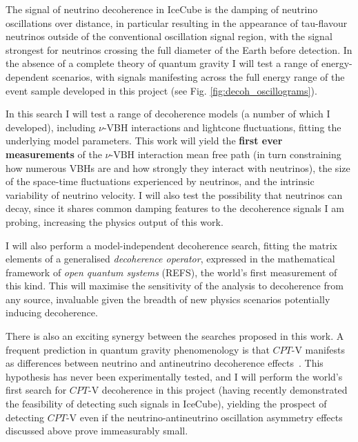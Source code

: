 \documentclass[a4paper,11pt]{article}
\begin{document}
The signal of neutrino decoherence in IceCube is the damping of neutrino oscillations over distance, in particular resulting in the appearance of tau-flavour neutrinos outside of the conventional oscillation signal region, with the signal strongest for neutrinos crossing the full diameter of the Earth before detection. In the absence of a complete theory of quantum gravity I will test a range of energy-dependent scenarios, with signals manifesting across the full energy range of the event sample developed in this project (see Fig. \ref{fig:decoh_oscillograms}).

In this search I will test a range of decoherence models (a number of which I developed), including $\nu$-VBH interactions and lightcone fluctuations, fitting the underlying model parameters. This work will yield the \textbf{first ever measurements} of the $\nu$-VBH interaction mean free path (in turn constraining how numerous VBHs are and how strongly they interact with neutrinos), the size of the space-time fluctuations experienced by neutrinos, and the intrinsic variability of neutrino velocity. I will also test the possibility that neutrinos can decay, since it shares common damping features to the decoherence signals I am probing, increasing the physics output of this work.

I will also perform a model-independent decoherence search, fitting the matrix elements of a generalised \textit{decoherence operator}, expressed in the mathematical framework of \textit{open quantum systems} (REFS), the world's first measurement of this kind. This will maximise the sensitivity of the analysis to decoherence from any source, invaluable given the breadth of new physics scenarios potentially inducing decoherence. 



There is also an exciting synergy between the searches proposed in this work. A frequent prediction in quantum gravity phenomenology is that $CPT$-V manifests as differences between neutrino and antineutrino decoherence effects~\cite{Mavromatos_2009, Barenboim:2004wu, Carrasco:2018sca, Buoninfante:2020iyr, Capolupo:2020myw}. This hypothesis has never been experimentally tested, and I will perform the world's first search for $CPT$-V decoherence in this project (having recently demonstrated the feasibility of detecting such signals in IceCube), yielding the prospect of detecting $CPT$-V even if the neutrino-antineutrino oscillation asymmetry effects discussed above prove immeasurably small.
\end{document}
